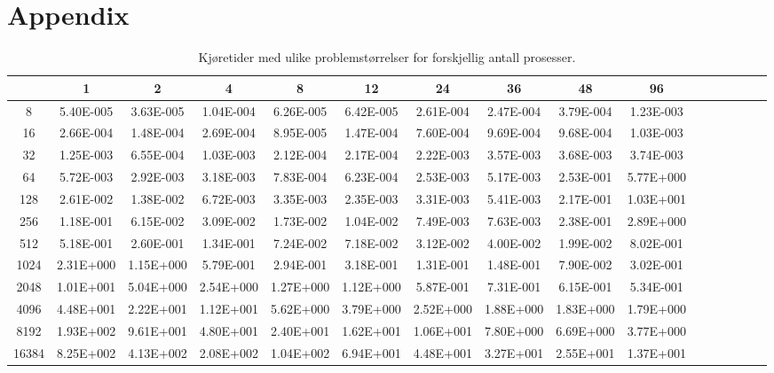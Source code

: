 \documentclass{article}
\begin{document}
\section{Appendix}
\begin{table}[h]
\label{table:wow_so_much_data}
\tiny
\begin{tabular}{c | c c c c c c c c c c c c c c c }
&1&2&4&8&12&24&36&48&96\\
\hline
8&5.40E-005&3.63E-005&1.04E-004&6.26E-005&6.42E-005&2.61E-004&2.47E-004&3.79E-004&1.23E-003\\
16&2.66E-004&1.48E-004&2.69E-004&8.95E-005&1.47E-004&7.60E-004&9.69E-004&9.68E-004&1.03E-003\\
32&1.25E-003&6.55E-004&1.03E-003&2.12E-004&2.17E-004&2.22E-003&3.57E-003&3.68E-003&3.74E-003\\
64&5.72E-003&2.92E-003&3.18E-003&7.83E-004&6.23E-004&2.53E-003&5.17E-003&2.53E-001&5.77E+000\\
128&2.61E-002&1.38E-002&6.72E-003&3.35E-003&2.35E-003&3.31E-003&5.41E-003&2.17E-001&1.03E+001\\
256&1.18E-001&6.15E-002&3.09E-002&1.73E-002&1.04E-002&7.49E-003&7.63E-003&2.38E-001&2.89E+000\\
512&5.18E-001&2.60E-001&1.34E-001&7.24E-002&7.18E-002&3.12E-002&4.00E-002&1.99E-002&8.02E-001\\
1024&2.31E+000&1.15E+000&5.79E-001&2.94E-001&3.18E-001&1.31E-001&1.48E-001&7.90E-002&3.02E-001\\
2048&1.01E+001&5.04E+000&2.54E+000&1.27E+000&1.12E+000&5.87E-001&7.31E-001&6.15E-001&5.34E-001\\
4096&4.48E+001&2.22E+001&1.12E+001&5.62E+000&3.79E+000&2.52E+000&1.88E+000&1.83E+000&1.79E+000\\
8192&1.93E+002&9.61E+001&4.80E+001&2.40E+001&1.62E+001&1.06E+001&7.80E+000&6.69E+000&3.77E+000\\
16384&8.25E+002&4.13E+002&2.08E+002&1.04E+002&6.94E+001&4.48E+001&3.27E+001&2.55E+001&1.37E+001\\
\end{tabular}
\caption{Kjøretider med ulike problemstørrelser for forskjellig antall prosesser.}
\end{table}
\end{document}
